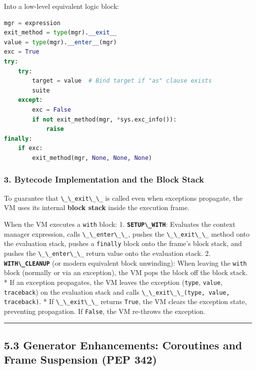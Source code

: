 Into a low-level equivalent logic block:

\begin{lstlisting}[language=Python]
mgr = expression
exit_method = type(mgr).__exit__
value = type(mgr).__enter__(mgr)
exc = True
try:
    try:
        target = value  # Bind target if "as" clause exists
        suite
    except:
        exc = False
        if not exit_method(mgr, *sys.exc_info()):
            raise
finally:
    if exc:
        exit_method(mgr, None, None, None)
\end{lstlisting}

\hypertarget{bytecode-implementation-and-the-block-stack}{%
\subsubsection{3. Bytecode Implementation and the Block
Stack}\label{bytecode-implementation-and-the-block-stack}}

To guarantee that \passthrough{\lstinline!\_\_exit\_\_!} is called even
when exceptions propagate, the VM uses its internal \textbf{block stack}
inside the execution frame.

When the VM executes a \passthrough{\lstinline!with!} block: 1.
\textbf{\passthrough{\lstinline!SETUP\_WITH!}}: Evaluates the context
manager expression, calls \passthrough{\lstinline!\_\_enter\_\_!},
pushes the \passthrough{\lstinline!\_\_exit\_\_!} method onto the
evaluation stack, pushes a \passthrough{\lstinline!finally!} block onto
the frame's block stack, and pushes the
\passthrough{\lstinline!\_\_enter\_\_!} return value onto the evaluation
stack. 2. \textbf{\passthrough{\lstinline!WITH\_CLEANUP!}} (or modern
equivalent block unwinding): When leaving the
\passthrough{\lstinline!with!} block (normally or via an exception), the
VM pops the block off the block stack. * If an exception propagates, the
VM leaves the exception (\passthrough{\lstinline!type!},
\passthrough{\lstinline!value!}, \passthrough{\lstinline!traceback!}) on
the evaluation stack and calls
\passthrough{\lstinline!\_\_exit\_\_(type, value, traceback)!}. * If
\passthrough{\lstinline!\_\_exit\_\_!} returns
\passthrough{\lstinline!True!}, the VM clears the exception state,
preventing propagation. If \passthrough{\lstinline!False!}, the VM
re-throws the exception.

\begin{center}\rule{0.5\linewidth}{0.5pt}\end{center}

\hypertarget{generator-enhancements-coroutines-and-frame-suspension-pep-342}{%
\subsection{5.3 Generator Enhancements: Coroutines and Frame Suspension
(PEP
342)}\label{generator-enhancements-coroutines-and-frame-suspension-pep-342}}

